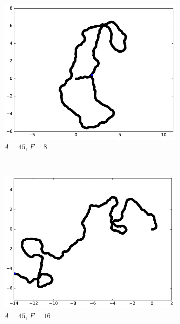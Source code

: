 \begin{appendices}
\begin{figure}[htbp]
\begin{subfigure}[t]{\subImgWmo}
			\centering
			\includegraphics[width=\textwidth]{figures/ch3/synTraj_219_45_8}
			\caption[$A = 45$, $F=8$]{$A = 45$, $F=8$}
			\label{fig:synTraj_219_45_8}
		\end{subfigure}
		~
		\begin{subfigure}[t]{\subImgWmo}
			\centering
			\includegraphics[width=\textwidth]{figures/ch3/synTraj_219_45_16}
			\caption[$A = 45$, $F=16$]{$A = 45$, $F=16$}
			\label{fig:synTraj_219_45_16}
		\end{subfigure}
		~
		\begin{subfigure}[t]{\subImgWmo}
			\centering

\end{subfigure}
\end{figure}
\end{appendices}
